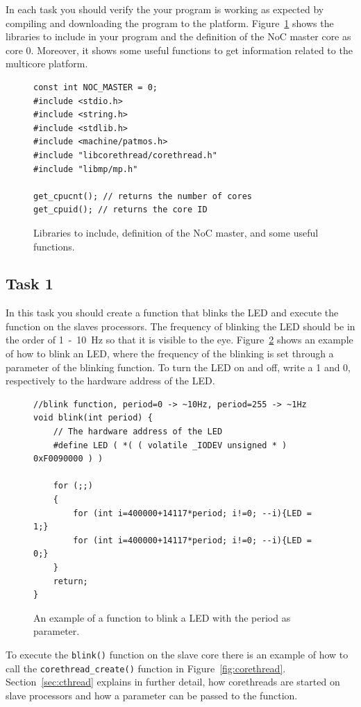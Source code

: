 \documentclass[a4paper,fontsize=10pt,twoside,DIV15,BCOR12mm,headinclude=true,footinclude=false,pagesize,bibtotoc]{scrbook}
\newcommand{\code}[1]{{\texttt{#1}}}
\begin{document}
\noindent In each task you should verify the your program is working as expected by compiling and downloading the program to the platform.
Figure~\ref{fig:header} shows the libraries to include in your program and the definition of the NoC master core as core 0.
Moreover, it shows some useful functions to get information related to the multicore platform.

\begin{figure}
\begin{Verbatim}[xleftmargin=1cm,xrightmargin=1cm,frame=single,framesep=3mm]
const int NOC_MASTER = 0;
#include <stdio.h>
#include <string.h>
#include <stdlib.h>
#include <machine/patmos.h>
#include "libcorethread/corethread.h"
#include "libmp/mp.h"

get_cpucnt(); // returns the number of cores
get_cpuid(); // returns the core ID
\end{Verbatim}
\caption{\label{fig:header}Libraries to include, definition of the NoC master, and some useful functions.}
\end{figure}

\subsection{Task 1}
In this task you should create a function that blinks the LED and execute the function on the slaves processors.
The frequency of blinking the LED should be in the order of 1~-~10~Hz so that it is visible to the eye.
Figure~\ref{fig:ctrl_led} shows an example of how to blink an LED, where the frequency of the blinking is set through a parameter of the blinking function.
To turn the LED on and off, write a 1 and 0, respectively to the hardware address of the LED. 

\begin{figure}
\begin{Verbatim}[xleftmargin=1cm,xrightmargin=1cm,frame=single,framesep=3mm]
//blink function, period=0 -> ~10Hz, period=255 -> ~1Hz
void blink(int period) {
	// The hardware address of the LED
	#define LED ( *( ( volatile _IODEV unsigned * ) 0xF0090000 ) )

	for (;;)
    {
		for (int i=400000+14117*period; i!=0; --i){LED = 1;}
		for (int i=400000+14117*period; i!=0; --i){LED = 0;}
    }
	return;
}
\end{Verbatim}
\caption{\label{fig:ctrl_led}An example of a function to blink a LED with the period as parameter.}
\end{figure}

To execute the \code{blink()} function on the slave core there is an example of
how to call the \code{corethread\_create()} function in Figure~\ref{fig:corethread}.
Section~\ref{sec:cthread} explains in further detail, how corethreads are started
on slave processors and how a parameter can be passed to the function.
\end{document}
